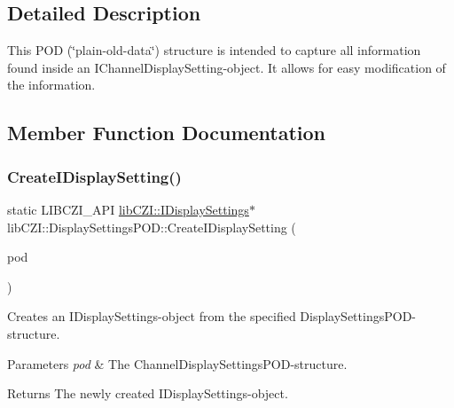 \subsection{Detailed Description}
This P\+OD (\char`\"{}plain-\/old-\/data\char`\"{}) structure is intended to capture all information found inside an I\+Channel\+Display\+Setting-\/object. It allows for easy modification of the information. 

\subsection{Member Function Documentation}
\mbox{\label{structlib_c_z_i_1_1_display_settings_p_o_d_acc98054af6df033b27b5c8214cb90284}} 
\subsubsection{\texorpdfstring{Create\+I\+Display\+Setting()}{CreateIDisplaySetting()}}
{\footnotesize\ttfamily static L\+I\+B\+C\+Z\+I\+\_\+\+A\+PI \hyperlink{classlib_c_z_i_1_1_i_display_settings}{lib\+C\+Z\+I\+::\+I\+Display\+Settings}$\ast$ lib\+C\+Z\+I\+::\+Display\+Settings\+P\+O\+D\+::\+Create\+I\+Display\+Setting (\begin{DoxyParamCaption}\item[{const \hyperlink{structlib_c_z_i_1_1_display_settings_p_o_d}{Display\+Settings\+P\+OD} \&}]{pod }\end{DoxyParamCaption})\hspace{0.3cm}{\ttfamily [static]}}

Creates an I\+Display\+Settings-\/object from the specified Display\+Settings\+P\+O\+D-\/structure. 
\begin{DoxyParams}{Parameters}
{\em pod} & The Channel\+Display\+Settings\+P\+O\+D-\/structure. \\
\hline
\end{DoxyParams}
\begin{DoxyReturn}{Returns}
The newly created I\+Display\+Settings-\/object. 
\end{DoxyReturn}
\mbox{\label{structlib_c_z_i_1_1_display_settings_p_o_d_afed6c69c9ffc6092c7d34706428767fa}} 
